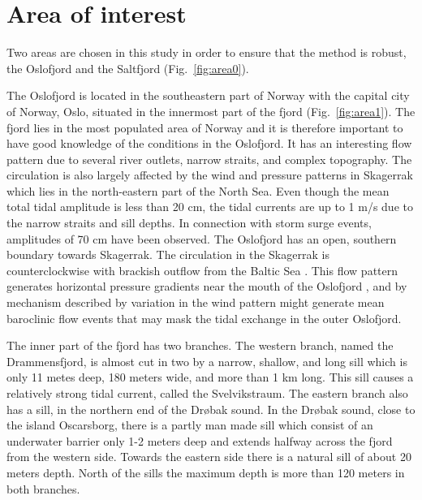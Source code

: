 \section{Area of interest}
Two areas are chosen in this study in order to ensure that the method is robust, the Oslofjord and the Saltfjord (Fig.~\ref{fig:area0}).

The Oslofjord is located in the southeastern part of Norway with the capital city of Norway, Oslo, situated in the innermost part of the fjord (Fig.~\ref{fig:area1}). The fjord lies in the most populated area of Norway and it is therefore important to have good knowledge of the conditions in the Oslofjord. It has an interesting flow pattern due to several river outlets, narrow straits, and complex topography. The circulation is also largely affected by the wind and pressure patterns in Skagerrak which lies in the north-eastern part of the North Sea. 
Even though the mean total tidal amplitude is less than 20 cm, the tidal currents are up to 1 m/s due to the narrow straits and sill depths. In connection with storm surge events, amplitudes of 70 cm have been observed. The Oslofjord has an open, southern boundary towards Skagerrak. The circulation in the Skagerrak is counterclockwise with brackish outflow from the Baltic Sea \cite[]{rodhe96,svendsen96}. This flow pattern generates horizontal pressure gradients near the mouth of the Oslofjord \cite[]{baals90}, and by mechanism described by \cite{klinck81} variation in the wind pattern might generate mean baroclinic flow events that may mask the tidal exchange in the outer Oslofjord.

The inner part of the fjord has two branches. The western branch, named the Drammensfjord, is almost cut in two by a narrow, shallow, and long sill which is only 11 metes deep, 180 meters wide, and more than 1 km long. This sill causes a relatively strong tidal current, called the Svelvikstraum. The eastern branch also has a sill, in the northern end of the Dr{\o}bak sound. In the Dr{\o}bak sound, close to the island Oscarsborg, there is a partly man made sill which consist of an underwater barrier only 1-2 meters deep and extends halfway across the fjord from the western side. Towards the eastern side there is a natural sill of about 20 meters depth. North of the sills the maximum depth is more than 120 meters in both branches. 

